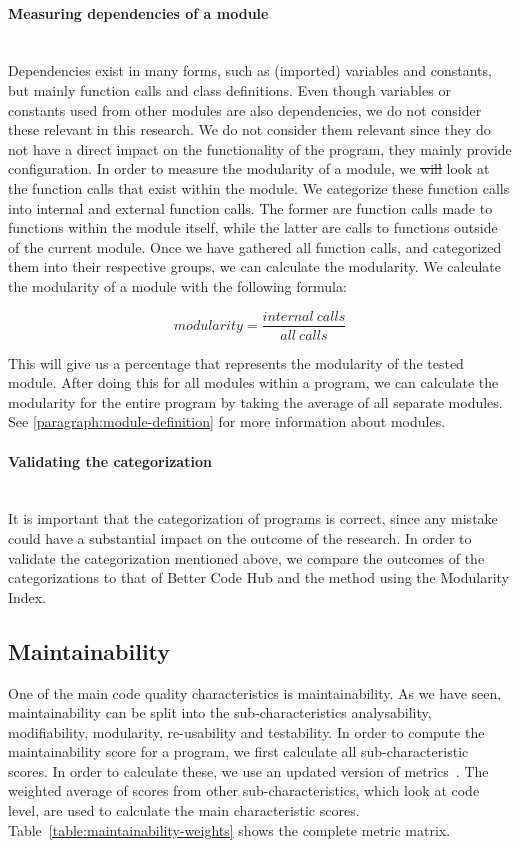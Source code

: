 \documentclass[twoside]{uva-inf-bachelor-thesis}
\newcommand{\myparagraph}[1]{\paragraph{#1}\mbox{}\\}
\begin{document}
\myparagraph{Measuring dependencies of a module}
Dependencies exist in many forms, such as (imported) variables and constants, but mainly function calls and class definitions. Even though variables or constants used from other modules are also dependencies, we do not consider these relevant in this research. We do not consider them relevant since they do not have a direct impact on the functionality of the program, they mainly provide configuration. In order to measure the modularity of a module, we \sout{will} look at the function calls that exist within the module. We categorize these function calls into internal and external function calls. The former are function calls made to functions within the module itself, while the latter are calls to functions outside of the current module. Once we have gathered all function calls, and categorized them into their respective groups, we can calculate the modularity. We calculate the modularity of a module with the following formula:

\[ modularity = \dfrac{internal\ calls}{all\ calls} \]

This will give us a percentage that represents the modularity of the tested module. After doing this for all modules within a program, we can calculate the modularity for the entire program by taking the average of all separate modules. See \autoref{paragraph:module-definition} for more information about modules.

\myparagraph{Validating the categorization}
It is important that the categorization of programs is correct, since any mistake could have a substantial impact on the outcome of the research. In order to validate the categorization mentioned above, we compare the outcomes of the categorizations to that of Better Code Hub\cite{BetterCodeHub} and the method using the Modularity Index\cite{emanuel2013modularity}.

\subsection{Maintainability}
One of the main code quality characteristics is maintainability. As we have seen, maintainability can be split into the sub-characteristics analysability, modifiability, modularity, re-usability and testability. In order to compute the maintainability score for a program, we first calculate all sub-characteristic scores. In order to calculate these, we  use an updated version of metrics~\cite{heitlager2016practical}. The weighted average of scores from other sub-characteristics, which look at code level, are used to calculate the main characteristic scores. Table~\ref{table:maintainability-weights} shows the complete metric matrix.
\end{document}
